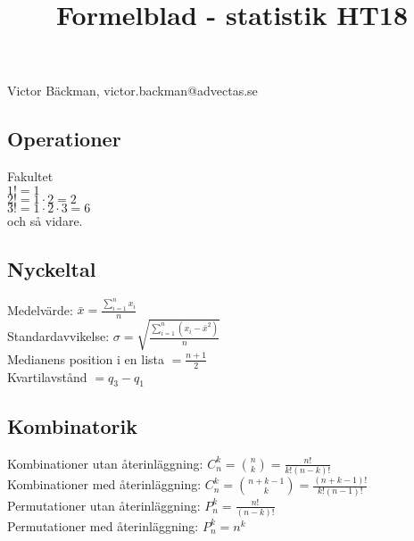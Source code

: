 \documentclass[a4paper,10pt]{article}
\title{Formelblad - statistik HT18}
\begin{document}
\maketitle
\begin{center}
  Victor Bäckman, victor.backman@advectas.se
\end{center}
\vspace{5mm}

\subsection*{Operationer}
Fakultet\\
$1! = 1$ \\
$2! = 1 \cdot 2 = 2$ \\
$3! = 1 \cdot 2 \cdot 3 = 6$ \\
och så vidare.

\subsection*{Nyckeltal}
Medelvärde: $\bar{x} = \frac{\sum_{i=1}^n x_i}{n}$ \\
Standardavvikelse: $\sigma = \sqrt{\frac{\sum_{i=1}^n (x_i - \bar{x}^2)}{n}}$ \\
Medianens position i en lista $= \frac{n+1}{2}$ \\
Kvartilavstånd $=q_3 -q_1$

\subsection*{Kombinatorik}
Kombinationer utan återinläggning: $C_n^k = \binom{n}{k} = \frac{n!}{k!(n-k)!}$ \\
Kombinationer med återinläggning: $C_n^k = \binom{n+k-1}{k} = \frac{(n+k-1)!}{k!(n-1)!}$ \\
Permutationer utan återinläggning: $P_n^k = \frac{n!}{(n-k)!}$ \\
Permutationer med återinläggning: $P_n^k = n^k$
\newpage
\end{document}
